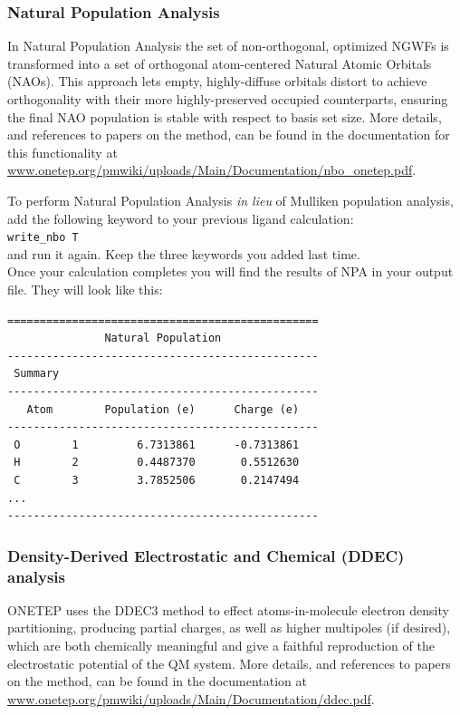 \documentclass{article}
\begin{document}
\subsubsection{Natural Population Analysis}
In Natural Population Analysis the set of non-orthogonal, optimized NGWFs is transformed into a set of orthogonal atom-centered Natural Atomic Orbitals (NAOs). This approach lets empty, highly-diffuse orbitals distort to achieve orthogonality with their more highly-preserved occupied counterparts, ensuring the final
NAO population is stable with respect to basis set size. More details, and references to papers on the method, can be found in the documentation for this functionality at \url{www.onetep.org/pmwiki/uploads/Main/Documentation/nbo_onetep.pdf}.

To perform Natural Population Analysis \textit{in lieu} of Mulliken population analysis, add the following keyword to your previous ligand calculation:\\

\noindent
\texttt{write\_nbo T}\\

\noindent
and run it again. Keep the three keywords you added last time.\\[2cm]

Once your calculation completes you will find the results of NPA in your output file. They will look like this:\vspace{-0.3cm}
\begin{verbatim}
================================================
               Natural Population               
------------------------------------------------
 Summary                                        
------------------------------------------------
   Atom        Population (e)      Charge (e)   
------------------------------------------------
 O        1         6.7313861      -0.7313861
 H        2         0.4487370       0.5512630
 C        3         3.7852506       0.2147494
...
------------------------------------------------
\end{verbatim}

\subsubsection{Density-Derived Electrostatic and Chemical (DDEC) analysis}
ONETEP uses the DDEC3 method\cite{ddec3} to effect atoms-in-molecule electron density partitioning, producing partial charges, as well as higher multipoles (if desired), which are both chemically meaningful and give a faithful reproduction of the electrostatic potential of the QM system. More details, and references to papers on the method, can be found in the documentation at \url{www.onetep.org/pmwiki/uploads/Main/Documentation/ddec.pdf}. 
\end{document}
